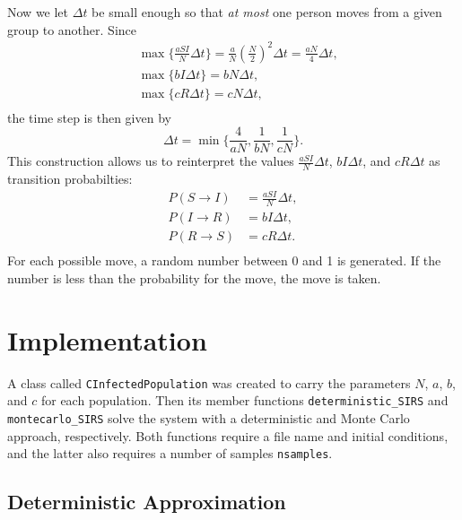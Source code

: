 \documentclass[prb,aps,twocolumn,showpacs,10pt]{revtex4-1}
\begin{document}
Now we let $\Delta t$ be small enough so that \textit{at most} one person moves from a given group to another. Since
\begin{equation}
\begin{split}
&\max \Big\{ \frac{aSI}{N}\Delta t \Big\} = \frac{a}{N}\left(\frac{N}{2}\right)^2\Delta t=\frac{aN}{4}\Delta t,\\
&\max \Big\{ bI\Delta t \Big\} = bN\Delta t,\\
&\max \Big\{ cR\Delta t \Big\} = cN\Delta t,\\
\end{split}
\end{equation}
the time step is then given by
\begin{equation}
\Delta t = \min \Big\{ \frac{4}{aN}, \frac{1}{bN}, \frac{1}{cN} \Big\}.
\end{equation}
This construction allows us to reinterpret the values $\frac{aSI}{N}\Delta t$, $bI\Delta t$, and $cR\Delta t$ as transition probabilties:
\begin{equation}
\begin{split}
P(S\rightarrow I) &= \frac{aSI}{N}\Delta t,\\
P(I \rightarrow R) &= bI\Delta t,\\
P(R \rightarrow S) &= cR\Delta t.\\
\end{split}
\end{equation}
For each possible move, a random number between 0 and 1 is generated. If the number is less than the probability for the move, the move is taken.\\


\section{Implementation}

A class called \texttt{CInfectedPopulation} was created to carry the parameters $N$, $a$, $b$, and $c$ for each population. Then its member functions \texttt{deterministic\_SIRS} and \texttt{montecarlo\_SIRS} solve the system with a deterministic and Monte Carlo approach, respectively. Both functions require a file name and initial conditions, and the latter also requires a number of samples \texttt{nsamples}.\\

\subsection{Deterministic Approximation}
\end{document}
